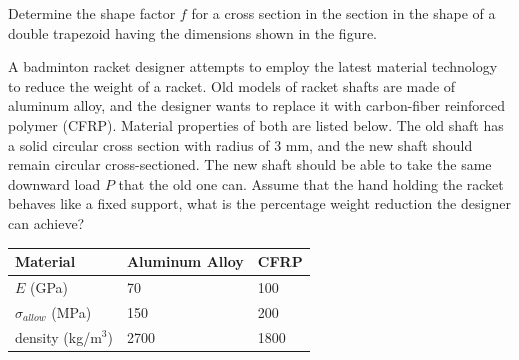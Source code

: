 \documentclass[
10pt,
a4paper,
openany,
svgnames,
]{book} %
\newcommand{\exercise}{%
\item\label{lab:\arabic{chapter}.\arabic{exercisesi}}  %
}
\begin{document}
\begin{exercises}
  \exercise Determine the shape factor $f$ for a cross section in the section in the shape of a double trapezoid having the dimensions shown in the figure.

  \begin{figure}[H]
    \centering
  \end{figure}
  
  \exercise A badminton racket designer attempts to employ the latest material technology to reduce the weight of a racket. Old models of racket shafts are made of aluminum alloy, and the designer wants to replace it with carbon-fiber reinforced polymer (CFRP). Material properties of both are listed below. The old shaft has a solid circular cross section with radius of 3 mm, and the new shaft should remain circular cross-sectioned. The new shaft should be able to take the same downward load $P$ that the old one can. Assume that the hand holding the racket behaves like a fixed support, what is the percentage weight reduction the designer can achieve?
	
  \begin{table}[H]
    \centering
    \begin{tabular}{C{3cm}  C{3cm} C{3cm} }
      \toprule
      Material	&		Aluminum Alloy		&		CFRP \\
      \midrule
      $E$ (GPa)	&		70	&		100	\\
      $\sigma_{allow}$	(MPa)	&		150	&		200	\\
      density (kg/m$^3$)	&		2700		&		1800		\\
      \bottomrule
    \end{tabular}
  \end{table}
  
\end{exercises}
\end{document}
